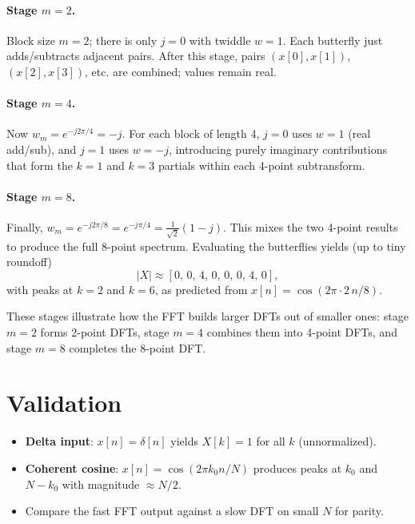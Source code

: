 \documentclass[11pt,a4paper]{article}
\begin{document}
\paragraph{Stage $m=2$.}
Block size $m=2$; there is only $j=0$ with twiddle $w=1$. Each butterfly just adds/subtracts adjacent pairs. After this stage, pairs $(x[0],x[1])$, $(x[2],x[3])$, etc. are combined; values remain real.

\paragraph{Stage $m=4$.}
Now $w_m = e^{-j 2\pi/4} = -j$. For each block of length 4, $j=0$ uses $w=1$ (real add/sub), and $j=1$ uses $w=-j$, introducing purely imaginary contributions that form the $k=1$ and $k=3$ partials within each 4-point subtransform.

\paragraph{Stage $m=8$.}
Finally, $w_m = e^{-j 2\pi/8} = e^{-j\pi/4} = \tfrac{1}{\sqrt{2}}(1 - j)$. This mixes the two 4-point results to produce the full 8-point spectrum. Evaluating the butterflies yields (up to tiny roundoff)
\begin{equation}
|X| \approx [0,\,0,\,4,\,0,\,0,\,0,\,4,\,0],
\end{equation}
with peaks at $k=2$ and $k=6$, as predicted from $x[n]=\cos(2\pi\cdot 2\,n/8)$.

These stages illustrate how the FFT builds larger DFTs out of smaller ones: stage $m=2$ forms 2-point DFTs, stage $m=4$ combines them into 4-point DFTs, and stage $m=8$ completes the 8-point DFT.

\section{Validation}
\begin{itemize}
  \item \textbf{Delta input}: $x[n]=\delta[n]$ yields $X[k]=1$ for all $k$ (unnormalized).
  \item \textbf{Coherent cosine}: $x[n]=\cos(2\pi k_0 n/N)$ produces peaks at $k_0$ and $N-k_0$ with magnitude $\approx N/2$.
  \item Compare the fast FFT output against a slow DFT on small $N$ for parity.
\end{itemize}
\end{document}

